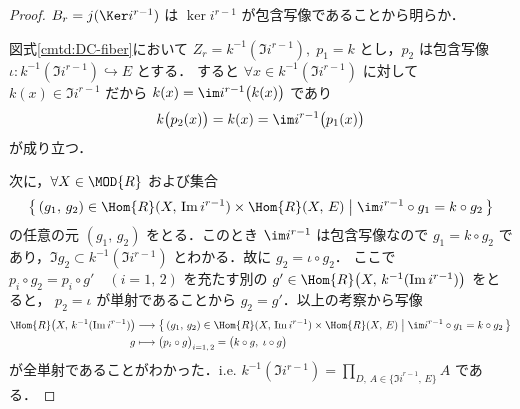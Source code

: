\documentclass[algtopo_main]{subfiles}
\begin{document}
\begin{proof}
    $B_r = j (\Ker i^{r-1})$ は $\ker i^{r-1}$ が包含写像であることから明らか．

    図式\ref{cmtd:DC-fiber}において $Z_r = k^{-1}(\Im i^{r-1}),\; p_1 = k$ とし，$p_2$ は包含写像 $\iota \colon k^{-1}(\Im i^{r-1}) \hookrightarrow E$ とする．
    すると $\forall x \in k^{-1}(\Im i^{r-1})$ に対して $k(x) \in \Im i^{r-1}$ だから $k(x) = \im i^{r-1} \bigl( k(x) \bigr)$ であり
    \begin{align}
        k \bigl( p_2(x) \bigr) = k(x) = \im i^{r-1}\bigl( p_1(x) \bigr) 
    \end{align}
    が成り立つ．

    次に，$\forall X \in \MOD{R}$ および集合
    \begin{align}
        \bigl\{\, (g_1,\, g_2) \in \Hom{R}(X,\, \Im i^{r-1}) \times  \Hom{R}(X,\, E)  \bigm| \im i^{r-1} \circ g_1 = k \circ g_2 \,\bigr\} 
    \end{align}
    の任意の元 $(g_1,\, g_2)$ をとる．このとき $\im i^{r-1}$ は包含写像なので $g_1 = k \circ g_2$ であり，$\Im g_2 \subset k^{-1}(\Im i^{r-1})$ とわかる．故に $g_2 = \iota \circ g_2$．
    ここで $p_i \circ g_2 = p_i \circ g' \quad (i = 1,\, 2)$ を充たす別の $g' \in \Hom{R}\bigl(X,\, k^{-1}(\Im i^{r-1})\bigr)$ をとると，
    $p_2 = \iota$ が単射であることから $g_2 = g'$．以上の考察から写像
    \begin{align}
        \Hom{R}\bigl(X,\, k^{-1}(\Im i^{r-1})\bigr) &\lto \bigl\{\, (g_1,\, g_2) \in \Hom{R}(X,\, \Im i^{r-1}) \times  \Hom{R}(X,\, E)  \bigm| \im i^{r-1} \circ g_1 = k \circ g_2 \,\bigr\} \\
        g &\lmto \bigl( p_i \circ g \bigr)_{i = 1,\, 2} = \bigl( k \circ g,\; \iota \circ g \bigr) 
    \end{align}
    が全単射であることがわかった．i.e. $k^{-1}(\Im i^{r-1}) = \prod_{D,\, A \in \{\Im i^{r-1},\, E\}} A$ である．

\end{proof}
\end{document}
